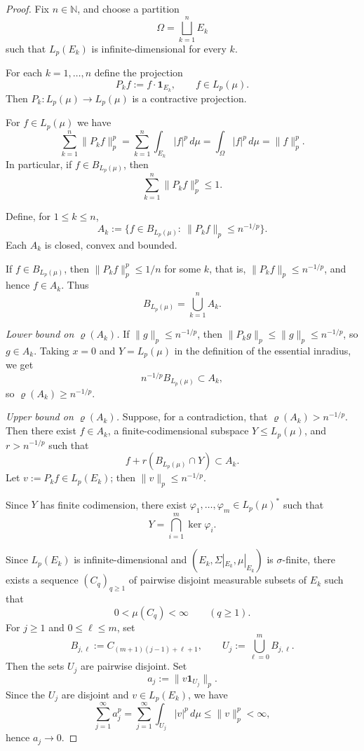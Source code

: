 \documentclass[10pt,a4paper]{amsart}
\renewcommand{\ge}{\geqslant}
\renewcommand{\le}{\leqslant}
\begin{document}
\begin{proof}
Fix $n\in\mathbb N$, and choose a partition
\[
\Omega=\bigsqcup_{k=1}^n E_k
\]
such that $L_p(E_k)$ is infinite-dimensional for every $k$.

For each $k=1,\dots,n$ define the projection
\[
P_k f := f\cdot\mathbf{1}_{E_k}, \qquad f\in L_p(\mu).
\]
Then $P_k:L_p(\mu)\to L_p(\mu)$ is a contractive projection.

For $f\in L_p(\mu)$ we have
\[
\sum_{k=1}^n \|P_k f\|_p^p
= \sum_{k=1}^n \int_{E_k} |f|^p\, d\mu
= \int_{\Omega} |f|^p\, d\mu
= \|f\|_p^p.
\]
In particular, if $f\in B_{L_p(\mu)}$, then
\[
\sum_{k=1}^n \|P_k f\|_p^p \le 1.
\]

Define, for $1\le k\le n$,
\[
A_k := \bigl\{ f\in B_{L_p(\mu)}:\ \|P_k f\|_p\le n^{-1/p} \bigr\}.
\]
Each $A_k$ is closed, convex and bounded.

If $f\in B_{L_p(\mu)}$, then $\|P_k f\|_p^p \le 1/n$ for some $k$, that
is, $\|P_k f\|_p\le n^{-1/p}$, and hence $f\in A_k$. Thus
\[
B_{L_p(\mu)} = \bigcup_{k=1}^n A_k.
\]

\smallskip
\noindent\emph{Lower bound on $\varrho(A_k)$.}
If $\|g\|_p\le n^{-1/p}$, then $\|P_k g\|_p\le \|g\|_p\le n^{-1/p}$, so
$g\in A_k$. Taking $x=0$ and $Y=L_p(\mu)$ in the definition of the
essential inradius, we get
\[
n^{-1/p} B_{L_p(\mu)} \subset A_k,
\]
so $\varrho(A_k)\ge n^{-1/p}$.

\smallskip
\noindent\emph{Upper bound on $\varrho(A_k)$.}
Suppose, for a contradiction, that $\varrho(A_k)>n^{-1/p}$. Then there exist
$f\in A_k$, a finite-codimensional subspace $Y\le L_p(\mu)$, and
$r>n^{-1/p}$ such that
\[
f + r(B_{L_p(\mu)}\cap Y)\subset A_k.
\]
Let $v := P_k f\in L_p(E_k)$; then $\|v\|_p\le n^{-1/p}$.

Since $Y$ has finite codimension, there exist $\varphi_1,\dots,\varphi_m\in
L_p(\mu)^*$ such that
\[
Y = \bigcap_{i=1}^m \ker\varphi_i.
\]

Since $L_p(E_k)$ is infinite-dimensional and $(E_k,\Sigma|_{E_k},\mu|_{E_k})$
is $\sigma$-finite, there exists a sequence $(C_q)_{q\ge1}$ of pairwise
disjoint measurable subsets of $E_k$ such that
\[
0<\mu(C_q)<\infty\qquad(q\ge1).
\]
For $j\ge1$ and $0\le \ell\le m$, set
\[
B_{j,\ell}:=C_{(m+1)(j-1)+\ell+1},
\qquad
U_j:=\bigcup_{\ell=0}^m B_{j,\ell}.
\]
Then the sets $U_j$ are pairwise disjoint. Set
\[
a_j := \|v\mathbf 1_{U_j}\|_p.
\]
Since the $U_j$ are disjoint and $v\in L_p(E_k)$, we have
\[
\sum_{j=1}^\infty a_j^p
=
\sum_{j=1}^\infty \int_{U_j}|v|^p\,d\mu
\le \|v\|_p^p<\infty,
\]
hence $a_j\to0$.


\end{proof}
\end{document}
